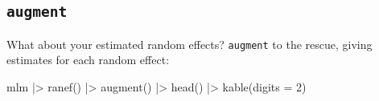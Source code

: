 \documentclass[
  letterpaper,
  DIV=11,
  numbers=noendperiod]{scrreprt}
\newenvironment{Shaded}{\begin{snugshade}}{\end{snugshade}}
\newcommand{\AttributeTok}[1]{\textcolor[rgb]{0.49,0.56,0.16}{#1}}
\newcommand{\DecValTok}[1]{\textcolor[rgb]{0.25,0.63,0.44}{#1}}
\newcommand{\FunctionTok}[1]{\textcolor[rgb]{0.02,0.16,0.49}{#1}}
\newcommand{\NormalTok}[1]{\textcolor[rgb]{0.00,0.44,0.13}{#1}}
\newcommand{\SpecialCharTok}[1]{\textcolor[rgb]{0.25,0.44,0.63}{#1}}
\begin{document}
\hypertarget{augment}{%
\subsection{\texorpdfstring{\texttt{augment}}{augment}}\label{augment}}

What about your estimated random effects? \texttt{augment} to the
rescue, giving estimates for each random effect:

\begin{Shaded}
\begin{Highlighting}[]
\NormalTok{mlm }\SpecialCharTok{|\textgreater{}} 
  \FunctionTok{ranef}\NormalTok{() }\SpecialCharTok{|\textgreater{}} 
  \FunctionTok{augment}\NormalTok{() }\SpecialCharTok{|\textgreater{}} 
  \FunctionTok{head}\NormalTok{() }\SpecialCharTok{|\textgreater{}} 
  \FunctionTok{kable}\NormalTok{(}\AttributeTok{digits =} \DecValTok{2}\NormalTok{)}
\end{Highlighting}
\end{Shaded}
\end{document}

